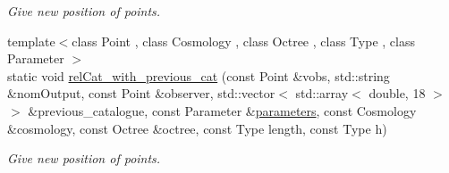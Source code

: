 \begin{DoxyCompactItemize}
\begin{DoxyCompactList}\small\item\em Give new position of points. \end{DoxyCompactList}\item 
{\footnotesize template$<$class Point , class Cosmology , class Octree , class Type , class Parameter $>$ }\\static void \hyperlink{classCatalogues_ac5d47e6c03ca41a96a1168f417dcb753}{rel\-Cat\-\_\-with\-\_\-previous\-\_\-cat} (const Point \&vobs, std\-::string \&nom\-Output, const Point \&observer, std\-::vector$<$ std\-::array$<$ double, 18 $>$ $>$ \&previous\-\_\-catalogue, const Parameter \&\hyperlink{rays_8h_ae1bc8b0b8c8b9f8e4cc61a5cc7c4ce9e}{parameters}, const Cosmology \&cosmology, const Octree \&octree, const Type length, const Type h)
\begin{DoxyCompactList}\small\item\em Give new position of points. \end{DoxyCompactList}\end{DoxyCompactItemize}


